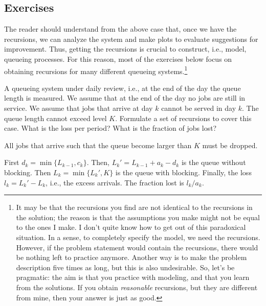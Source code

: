 \subsection*{Exercises}
\label{sec:exercises-1}


The reader should understand from the above case that, once we have the recursions, we can analyze the system and make plots to evaluate suggestions for improvement.
Thus, getting the recursions is crucial to construct, i.e., model, queueing processes.
For this reason, most of the exercises below focus on obtaining recursions for many different queueing systems.\footnote{It may be that the recursions you find are not identical to the recursions in the solution; the reason is that the assumptions you make might not be equal to the ones I make.
  I don't quite know how to get out of this paradoxical situation.
  In a sense, to completely specify the model, we need the recursions.
  However, if the problem statement would contain the recursions, there would be nothing left to practice anymore.
  Another way is to make the problem description five times as long, but this is also undesirable.
  So, let's be pragmatic: the aim is that you practice with modeling, and that you learn from the solutions.
  If you obtain \emph{reasonable} recursions, but they are different from mine, then your answer is just as good.}

\begin{exercise} A queueing system
  under daily review, i.e., at the end of the day the queue length is
  measured. We assume that at the end of the day no jobs are still in
  service. We assume that jobs that arrive at day $k$ cannot be served
  in day $k$. The queue length cannot exceed level $K$.  Formulate a
  set of recursions to cover this case. What is the loss per period? What is the fraction of jobs lost?
  \begin{solution}

    All jobs that arrive such that the queue become larger than $K$
    must be dropped. 

First $d_k = \min\{L_{k-1}, c_k\}$. Then, $L_k' = L_{k-1}+a_k-d_k$ is the queue without blocking. Then $L_k=\min\{L_k', K\}$ is the queue with blocking. Finally, the loss $l_k=L_k'-L_k$, i.e., the excess arrivals. The fraction lost is $l_k/a_k$. 
  \end{solution}
\end{exercise}

